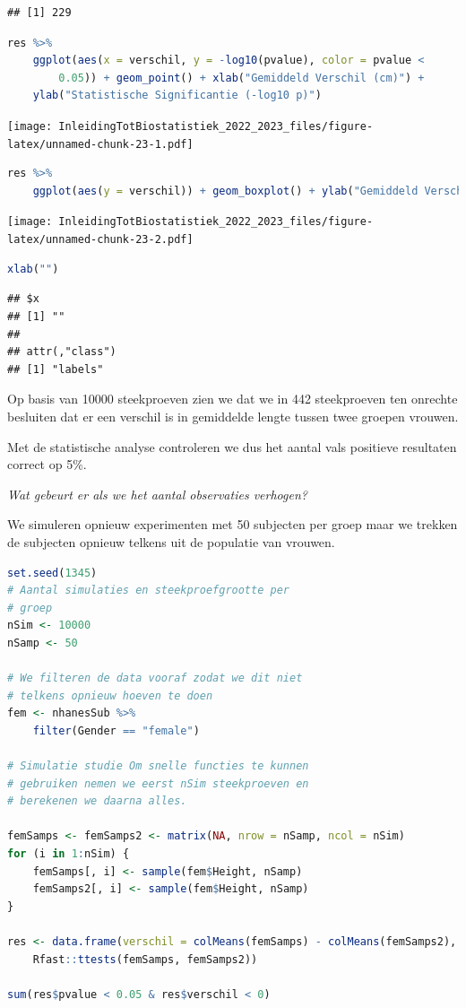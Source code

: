 \documentclass[
  12pt,dutch,coursenotes]{book}
\begin{document}
\begin{lstlisting}
## [1] 229
\end{lstlisting}

\begin{lstlisting}[language=R]
res %>%
    ggplot(aes(x = verschil, y = -log10(pvalue), color = pvalue <
        0.05)) + geom_point() + xlab("Gemiddeld Verschil (cm)") +
    ylab("Statistische Significantie (-log10 p)")
\end{lstlisting}

\texttt{[image: InleidingTotBiostatistiek\_2022\_2023\_files/figure-latex/unnamed-chunk-23-1.pdf]}

\begin{lstlisting}[language=R]
res %>%
    ggplot(aes(y = verschil)) + geom_boxplot() + ylab("Gemiddeld Verschil (cm)")
\end{lstlisting}

\texttt{[image: InleidingTotBiostatistiek\_2022\_2023\_files/figure-latex/unnamed-chunk-23-2.pdf]}

\begin{lstlisting}[language=R]
xlab("")
\end{lstlisting}

\begin{lstlisting}
## $x
## [1] ""
## 
## attr(,"class")
## [1] "labels"
\end{lstlisting}

Op basis van 10000 steekproeven zien we dat we in 442 steekproeven ten onrechte besluiten dat er een verschil is in gemiddelde lengte tussen twee groepen vrouwen.

Met de statistische analyse controleren we dus het aantal vals positieve resultaten correct op 5\%.

\emph{Wat gebeurt er als we het aantal observaties verhogen?}

We simuleren opnieuw experimenten met 50 subjecten per groep maar we trekken de subjecten opnieuw telkens uit de populatie van vrouwen.

\begin{lstlisting}[language=R]
set.seed(1345)
# Aantal simulaties en steekproefgrootte per
# groep
nSim <- 10000
nSamp <- 50

# We filteren de data vooraf zodat we dit niet
# telkens opnieuw hoeven te doen
fem <- nhanesSub %>%
    filter(Gender == "female")

# Simulatie studie Om snelle functies te kunnen
# gebruiken nemen we eerst nSim steekproeven en
# berekenen we daarna alles.

femSamps <- femSamps2 <- matrix(NA, nrow = nSamp, ncol = nSim)
for (i in 1:nSim) {
    femSamps[, i] <- sample(fem$Height, nSamp)
    femSamps2[, i] <- sample(fem$Height, nSamp)
}

res <- data.frame(verschil = colMeans(femSamps) - colMeans(femSamps2),
    Rfast::ttests(femSamps, femSamps2))

sum(res$pvalue < 0.05 & res$verschil < 0)
\end{lstlisting}
\end{document}
